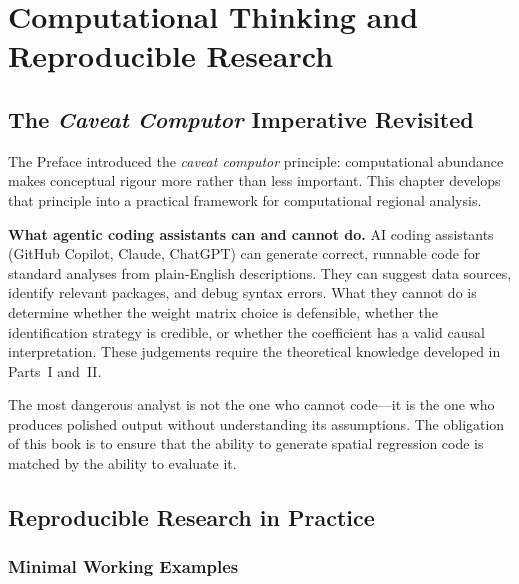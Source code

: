 
\chapter{Computational Thinking and Reproducible Research}
\label{chap_Computational}

\section{The \textit{Caveat Computor} Imperative Revisited}
\label{sec_CavetComputorRevisit}

The Preface introduced the \emph{caveat computor} principle: computational
abundance makes conceptual rigour more rather than less important. This
chapter develops that principle into a practical framework for computational
regional analysis.

\noindent\textbf{What agentic coding assistants can and cannot do.}
AI coding assistants (GitHub Copilot, Claude, ChatGPT) can generate correct,
runnable code for standard analyses from plain-English descriptions. They can
suggest data sources, identify relevant packages, and debug syntax errors.
What they cannot do is determine whether the weight matrix choice is
defensible, whether the identification strategy is credible, or whether
the coefficient has a valid causal interpretation. These judgements require
the theoretical knowledge developed in Parts~I and~II.

The most dangerous analyst is not the one who cannot code---it is the one
who produces polished output without understanding its assumptions. The
obligation of this book is to ensure that the ability to generate spatial
regression code is matched by the ability to evaluate it.


\section{Reproducible Research in Practice}
\label{sec_Reproducible_ch11}

\subsection{Minimal Working Examples}

